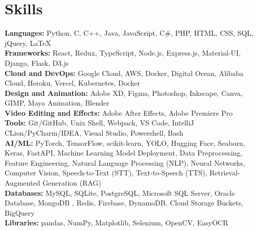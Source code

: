 \documentclass[letterpaper,11pt]{article}
\begin{document}
\section{Skills}
 \begin{itemize}[leftmargin=0.15in, label={}]
    \small{\item{
    
    \textbf{Languages:} {Python, C, C++, Java, JavaScript, C\#, PHP,  HTML, CSS, SQL, jQuery, \LaTeX}\\
    \textbf{Frameworks:} {React, Redux, TypeScript, Node.js, Express.js, Material-UI, Django, Flask, D3.js}\\
    \textbf{Cloud and DevOps:} {Google Cloud, AWS, Docker, Digital Ocean, Alibaba Cloud, Heroku, Vercel, Kubernetes, Docker}\\
\textbf{Design and Animation:} {Adobe XD, Figma, Photoshop, Inkscape, Canva, GIMP, Maya Animation, Blender}\\
\textbf{Video Editing and Effects:} {Adobe After Effects, Adobe Premiere Pro}\\
    \textbf{Tools:} {Git/GitHub, Unix Shell, Webpack, VS Code, IntelliJ CLion/PyCharm/IDEA, Visual Studio, Powershell, Bash}\\
    \textbf{AI/ML:} {PyTorch, TensorFlow, scikit-learn, YOLO, Hugging Face, Seaborn, Keras, FastAPI, Machine Learning Model Deployment, Data Preprocessing, Feature Engineering, Natural Language Processing (NLP), Neural Networks, Computer Vision, Speech-to-Text (STT), Text-to-Speech (TTS), Retrieval-Augmented Generation (RAG)}\\
     	\textbf{Databases:} {MySQL, SQLite, PostgreSQL, Microsoft SQL Server, Oracle Database, MongoDB , Redis, Firebase, DynamoDB, Cloud Storage Buckets, BigQuery}\\
	\textbf{Libraries:} {pandas, NumPy, Matplotlib, Selenium, OpenCV, EasyOCR}


    }}
 \end{itemize}


\end{document}
